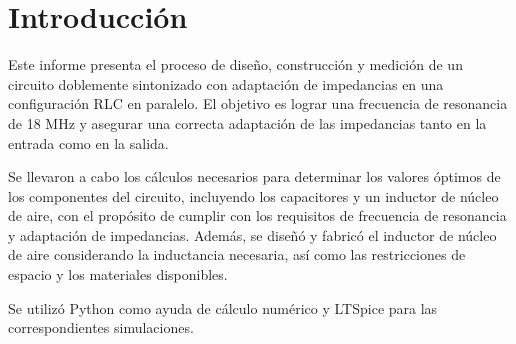 \section{Introducción}

Este informe presenta el proceso de diseño, construcción y medición de un circuito doblemente sintonizado con adaptación de impedancias en una configuración RLC en paralelo. El objetivo es lograr una frecuencia de resonancia de 18 MHz y asegurar una correcta adaptación de las impedancias tanto en la entrada como en la salida.

Se llevaron a cabo los cálculos necesarios para determinar los valores óptimos de los componentes del circuito, incluyendo los capacitores y un inductor de núcleo de aire, con el propósito de cumplir con los requisitos de frecuencia de resonancia y adaptación de impedancias. Además, se diseñó y fabricó el inductor de núcleo de aire considerando la inductancia necesaria, así como las restricciones de espacio y los materiales disponibles.

Se utilizó Python como ayuda de cálculo numérico y LTSpice para las correspondientes simulaciones.

